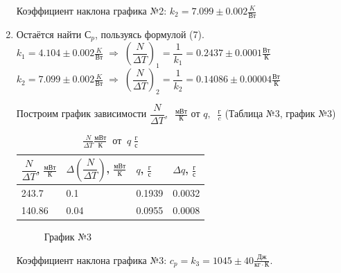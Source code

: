 \documentclass[a4paper,12pt]{article}
\begin{document}
\begin{enumerate}
		Коэффициент наклона графика №2: $k_2 = 7.099\pm0.002 \frac{K}{Вт}$
		
		\item Остаётся найти $С_p$, пользуясь формулой (7).
		\\ $k_1 = 4.104\pm0.002 \frac{K}{Вт} \; \Rightarrow \; \left(\dfrac{N}{\Delta T}\right)_1 = \dfrac{1}{k_1} = 0.2437 \pm 0.0001 \frac{Вт}{К}$
		\\ $k_2 = 7.099\pm0.002 \frac{K}{Вт} \; \Rightarrow \; \left(\dfrac{N}{\Delta T}\right)_2 = \dfrac{1}{k_2} = 0.14086 \pm 0.00004 \frac{Вт}{К}$

		Построим график зависимости $\dfrac{N}{\Delta T},\;\; \frac{мВт}{К}$  от  $q,\;\; \frac{г}{c}$ (Таблица №3, график №3)
		
		\begin{table}[h!] 
			\caption{$\frac{N}{\Delta T} \frac{мВт}{К} \;\;{от}\;\; q \; \frac{г}{с}$}
			\begin{center}
				\begin{tabular}{|*{4}{l|}}
					\hline
					$\dfrac{N}{\Delta T}$, $\frac{мВт}{К}$ & $\Delta \left(\dfrac{N}{\Delta T}\right)$, $\frac{мВт}{К}$ & $q$, $\frac{г}{с}$ & $\Delta q$, $\frac{г}{с}$ \\ \hline
					243.7 & 0.1 & 0.1939 & 0.0032 \\ \hline
					140.86 & 0.04 & 0.0955 & 0.0008 \\ \hline
				\end{tabular}
			\end{center}
		\end{table}
		\begin{figure}[h!]
							\caption[]{\label{fig:5} График №3}
		\end{figure}

		Коэффициент наклона графика №3: $c_p = k_3 = 1045 \pm 40 \frac{Дж}{кг\cdot К}$.
	\end{enumerate}
\end{document}
